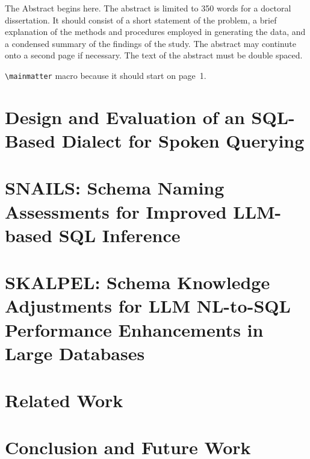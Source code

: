 \documentclass[12pt]{ucsddissertation}
\begin{document}
\begin{dissertationabstract}
The Abstract begins here. The abstract is limited to 350 words for a
doctoral dissertation. It should consist of a short statement of the
problem, a brief explanation of the methods and procedures employed in
generating the data, and a condensed summary of the findings of the
study. The abstract may continute onto a second page if necessary. The
text of the abstract must be double spaced.
\end{dissertationabstract}

\mainmatter

\begin{dissertationintroduction}

\verb!\mainmatter! macro because it should start on page~1.
\end{dissertationintroduction}




\chapter{Design and Evaluation of an SQL-Based Dialect for Spoken Querying}



\chapter{SNAILS: Schema Naming Assessments for Improved LLM-based SQL Inference}



\chapter{SKALPEL: Schema Knowledge Adjustments for LLM NL-to-SQL Performance Enhancements in Large Databases}



\chapter{Related Work}


\chapter{Conclusion and Future Work}


\appendix

\backmatter

\end{document}

